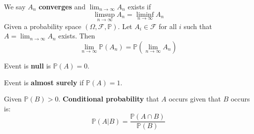 \documentclass{huhtakm-template-book}
\newcommand{\prob}{\mathbb{P}}
\begin{document}
    \begin{sdefn}
        We say $A_{n}$ \textbf{converges} and $\lim_{n\to\infty}A_{n}$ exists if
        \begin{equation*}
            \limsup_{n\to\infty}A_{n}=\liminf_{n\to\infty}A_{n}
        \end{equation*}
        Given a probability space $(\Omega,\mathcal{F},\prob)$. Let $A_{i}\in\mathcal{F}$ for all $i$ such that $A=\lim_{n\to\infty}A_{n}$ exists. Then
        \begin{equation*}
            \lim_{n\to\infty}\prob(A_{n})=\prob\left(\lim_{n\to\infty}A_{n}\right)
        \end{equation*}
    \end{sdefn}
    \begin{sdefn}
        Event is \textbf{null} is $\prob(A)=0$.
    \end{sdefn}
    \begin{sdefn}
        Event is \textbf{almost surely} if $\prob(A)=1$.
    \end{sdefn}
    \begin{sdefn}
        Given $\prob(B)>0$. \textbf{Conditional probability} that $A$ occurs given that $B$ occurs is:
        \begin{equation*}
            \prob(A|B)=\frac{\prob(A\cap B)}{\prob(B)}
        \end{equation*}
    \end{sdefn}
\end{document}
